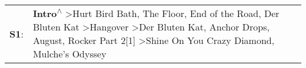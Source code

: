 \begin{supertabular}{p{0.03\textwidth}p{0.92\textwidth}}
 \textbf{S1}:  &  \textbf{Intro\textsuperscript{$\wedge$}} \textgreater \enspace Hurt Bird Bath\textsuperscript{}, \enspace The Floor\textsuperscript{}, \enspace End of the Road\textsuperscript{}, \enspace Der Bluten Kat\textsuperscript{} \textgreater \enspace Hangover\textsuperscript{} \textgreater \enspace Der Bluten Kat\textsuperscript{}, \enspace Anchor Drops\textsuperscript{}, \enspace August\textsuperscript{}, \enspace Rocker Part 2[1]\textsuperscript{} \textgreater \enspace Shine On You Crazy Diamond\textsuperscript{}, \enspace Mulche's Odyssey\textsuperscript{}  \enspace  \\
\end{supertabular}
